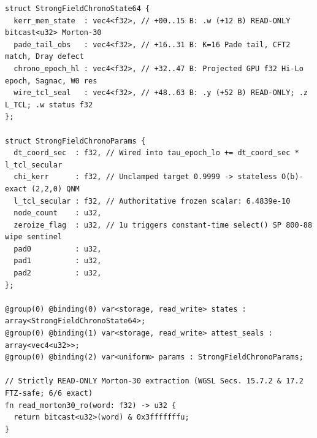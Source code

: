 \documentclass[11pt,a4paper,reqno]{article}
\def\texttt#1{#1}%
\theoremstyle{plain}
\theoremstyle{definition}
\theoremstyle{remark}
\numberwithin{equation}{section}
\numberwithin{table}{section}
\begin{document}
\begin{lstlisting}[style=puristkernel,caption={Canonical Listing~7.1: Zero-Allocation 64-Byte FTZ-Safe Strong-Field \& Chronometric WebGPU ABI (\texttt{StrongFieldChronoState64}) with Non-Copied Direct Storage Morton-30 Reads, Individual Non-Morton Lane Writes, Full $14/14$ Non-Morton \texttt{f32} SP~800-88 Wipe, Wired \texttt{chi\_kerr}/\texttt{dt\_coord\_sec}, Zero \texttt{f32} Integer Transits, and Companion \texttt{vec4<u32>} \texttt{TMD12-BB} Attestation.},label={lst:wgsl_abi_vol7}]
struct StrongFieldChronoState64 {
  kerr_mem_state  : vec4<f32>, // +00..15 B: .w (+12 B) READ-ONLY bitcast<u32> Morton-30
  pade_tail_obs   : vec4<f32>, // +16..31 B: K=16 Pade tail, CFT2 match, Dray defect
  chrono_epoch_hl : vec4<f32>, // +32..47 B: Projected GPU f32 Hi-Lo epoch, Sagnac, W0 res
  wire_tcl_seal   : vec4<f32>, // +48..63 B: .y (+52 B) READ-ONLY; .z L_TCL; .w status f32
};

struct StrongFieldChronoParams {
  dt_coord_sec  : f32, // Wired into tau_epoch_lo += dt_coord_sec * l_tcl_secular
  chi_kerr      : f32, // Unclamped target 0.9999 -> stateless O(b)-exact (2,2,0) QNM
  l_tcl_secular : f32, // Authoritative frozen scalar: 6.4839e-10
  node_count    : u32,
  zeroize_flag  : u32, // 1u triggers constant-time select() SP 800-88 wipe sentinel
  pad0          : u32,
  pad1          : u32,
  pad2          : u32,
};

@group(0) @binding(0) var<storage, read_write> states : array<StrongFieldChronoState64>;
@group(0) @binding(1) var<storage, read_write> attest_seals : array<vec4<u32>>;
@group(0) @binding(2) var<uniform> params : StrongFieldChronoParams;

// Strictly READ-ONLY Morton-30 extraction (WGSL Secs. 15.7.2 & 17.2 FTZ-safe; 6/6 exact)
fn read_morton30_ro(word: f32) -> u32 {
  return bitcast<u32>(word) & 0x3fffffffu;
}


\end{lstlisting}
\end{document}
